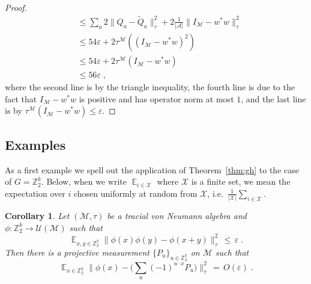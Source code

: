 \documentclass[11pt]{article}
\newtheorem{corollary}[theorem]{Corollary}
\theoremstyle{definition}
\DeclareMathOperator*{\Expectation}{\mathbb{E}}
\newcommand{\Es}[1]{\Expectation_{#1}}
\newcommand{\C}{\ensuremath{\mathbb{C}}}
\newcommand{\Z}{\ensuremath{\mathbb{Z}}}
\newcommand{\mA}{\ensuremath{\mathcal{A}}}
\newcommand{\mM}{\ensuremath{\mathcal{M}}}
\newcommand{\mU}{\ensuremath{\mathcal{U}}}
\newcommand{\mX}{\ensuremath{\mathcal{X}}}
\newcommand{\eps}{\varepsilon}
\begin{document}
\begin{proof}
\begin{align*}
&\leq  \sum_a 2\big\|{Q}_a - \tilde{Q}_a\big\|_\tau^2  + 2\frac{1}{|\mA|}\big\|I_\mM - w^* w\big\|_\tau^2 \\
&\leq 54 \eps + 2 \tau^\mM( (I_\mM - w^* w)^2 ) \\
&\leq 54 \eps + 2 \tau^\mM(I_\mM - w^* w ) \\
&\leq 56 \eps\;,
\end{align*}
where the second line is by the triangle inequality, the fourth line is due to the fact that $I_\mM - w^* w$ is positive and has operator norm at most $1$, and the last line is by $\tau^\mM(I_\mM - w^* w ) \leq \eps$.
\end{proof}


\subsection{Examples}
\label{sec:examples}

As a first example we spell out the application of Theorem~\ref{thm:gh} to the case of $G=\Z_2^k$. 
Below, when we write $\Es{i\in \mX}$ where $\mX$ is a finite set, we mean the expectation over $i$ chosen uniformly at random from $\mX$, i.e.\ $\frac{1}{|\mX|} \sum_{i\in \mX}$. 

\begin{corollary}\label{cor:lin-test} %
Let $(\mM,\tau)$ be a tracial von Neumann algebra and $\phi:\Z_2^k \to \mU(\mM)$ such that 
\[ \Es{x,y\in \Z_2^k} \big\| \phi(x)\phi(y)-\phi(x+y) \big\|_{\tau}^2 \,\leq\,\eps\;.\]
Then there is a %
projective measurement $\{P_u\}_{u\in \Z_2^k}$ on $\mM$ such that 
\[ \Es{x\in \Z_2^k} \Big\| \phi(x) -\Big(\sum_u (-1)^{u\cdot x} P_u\Big)  \Big\|_{\tau}^2 \,=\, O(\eps)\;.\]
\end{corollary} 
\end{document}
